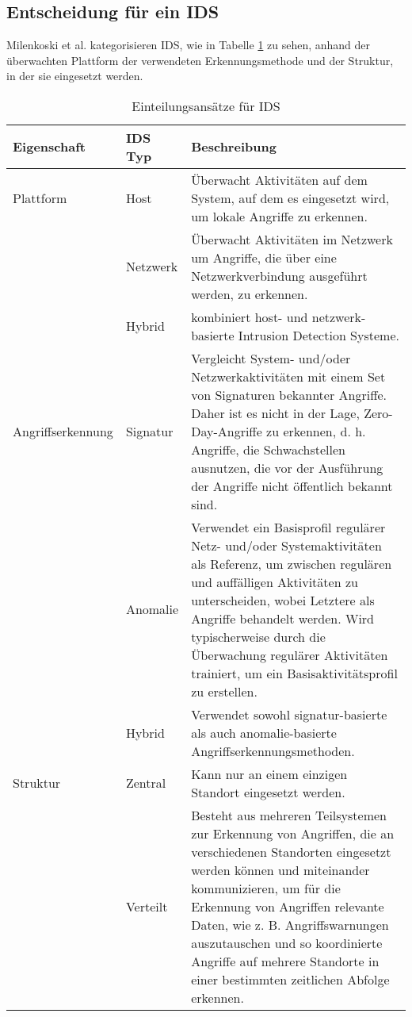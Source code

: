 \subsection{Entscheidung für ein IDS}Milenkoski et al. \cite{milenkoski_evaluating_2015} kategorisieren IDS, wie in Tabelle \ref{Tabelle_1} zu sehen, anhand der überwachten Plattform der verwendeten Erkennungsmethode und der Struktur, in der sie eingesetzt werden.
\begin{table}[H]
\label{Tabelle_1}
\caption{Einteilungsansätze für IDS}
\begin{tabularx}{\columnwidth}{p{3cm} l p{10cm}}
\toprule
Eigenschaft 
& IDS Typ 
& Beschreibung\\
\midrule
Plattform   
& Host     
& Überwacht Aktivitäten auf dem System, auf dem es eingesetzt wird, um lokale Angriffe zu erkennen.\\\addlinespace[0.5em]
& Netzwerk 
& Überwacht Aktivitäten im Netzwerk um Angriffe, die über eine Netzwerkverbindung ausgeführt werden, zu erkennen.\\\addlinespace[0.5em] 
& Hybrid   
& kombiniert host- und netzwerk-basierte Intrusion Detection Systeme.\\
\midrule
Angriffserkennung 
& Signatur        
& Vergleicht System- und/oder Netzwerkaktivitäten mit einem Set von Signaturen bekannter Angriffe. Daher ist es nicht in der Lage, Zero-Day-Angriffe zu erkennen, d. h. Angriffe, die Schwachstellen ausnutzen, die vor der Ausführung der Angriffe nicht öffentlich bekannt sind.\\\addlinespace[0.5em]
& Anomalie        
& Verwendet ein Basisprofil regulärer Netz- und/oder Systemaktivitäten als Referenz, um zwischen regulären und auffälligen Aktivitäten zu unterscheiden, wobei Letztere als Angriffe behandelt werden. Wird typischerweise durch die Überwachung regulärer Aktivitäten trainiert, um ein Basisaktivitätsprofil zu erstellen.\\\addlinespace[0.5em]
& Hybrid          
& Verwendet sowohl signatur-basierte als auch anomalie-basierte Angriffserkennungsmethoden.\\ 
\midrule
Struktur
& Zentral
& Kann nur an einem einzigen Standort eingesetzt werden.\\\addlinespace[0.5em]
& Verteilt
& Besteht aus mehreren Teilsystemen zur Erkennung von Angriffen, die an verschiedenen Standorten eingesetzt werden können und miteinander kommunizieren, um für die Erkennung von Angriffen relevante Daten, wie z. B. Angriffswarnungen auszutauschen und so koordinierte Angriffe auf mehrere Standorte in einer bestimmten zeitlichen Abfolge erkennen.\\
\bottomrule
\end{tabularx}
\end{table}

